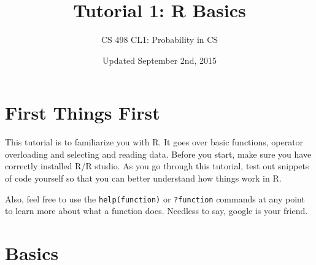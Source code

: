 \documentclass[12pt]{article}
\title{\huge Tutorial 1: R Basics}
\author{CS 498 CL1: Probability in CS}
\date{Updated September 2nd, 2015}
\begin{document}
\maketitle

\section{First Things First}

This tutorial is to familiarize you with R. It goes over basic functions,
operator overloading and selecting and reading data. Before you start,
make sure you have correctly installed R/R studio. As you go through this tutorial,
test out snippets of code yourself so that you can better understand how things
work in R.

Also, feel free to use the \texttt{help(function)} or \texttt{?function} commands
at any point to learn more about what a function does. Needless to say, google
is your friend.

\section{Basics}
\end{document}
